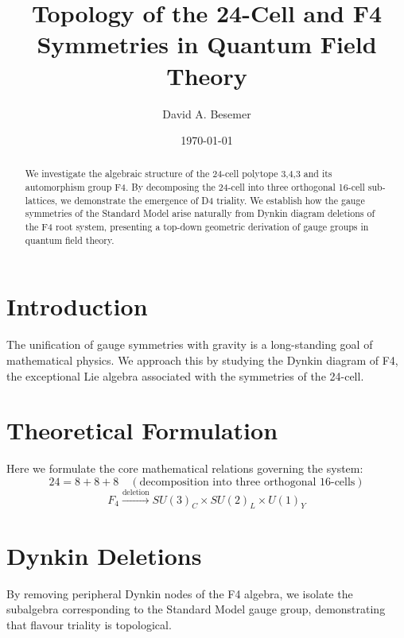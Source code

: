 \documentclass[amsmath,amssymb,aps,prd,twocolumn,superscriptaddress,nofootinbib]{revtex4-2}
\begin{document}

\title{Topology of the 24-Cell and F4 Symmetries in Quantum Field Theory}

\author{David A. Besemer}

\date{\today}

\begin{abstract}
We investigate the algebraic structure of the 24-cell polytope {3,4,3} and its automorphism group F4. By decomposing the 24-cell into three orthogonal 16-cell sub-lattices, we demonstrate the emergence of D4 triality. We establish how the gauge symmetries of the Standard Model arise naturally from Dynkin diagram deletions of the F4 root system, presenting a top-down geometric derivation of gauge groups in quantum field theory.
\end{abstract}

\maketitle

\section{Introduction}
The unification of gauge symmetries with gravity is a long-standing goal of mathematical physics. We approach this by studying the Dynkin diagram of F4, the exceptional Lie algebra associated with the symmetries of the 24-cell.

\section{Theoretical Formulation}
Here we formulate the core mathematical relations governing the system:
\begin{equation}
  24 = 8 + 8 + 8 \quad (\text{decomposition into three orthogonal 16-cells})
\end{equation}
\begin{equation}
  F_4 \xrightarrow{\text{deletion}} SU(3)_C \times SU(2)_L \times U(1)_Y
\end{equation}
\section{Dynkin Deletions}
By removing peripheral Dynkin nodes of the F4 algebra, we isolate the subalgebra corresponding to the Standard Model gauge group, demonstrating that flavour triality is topological.
\end{document}
